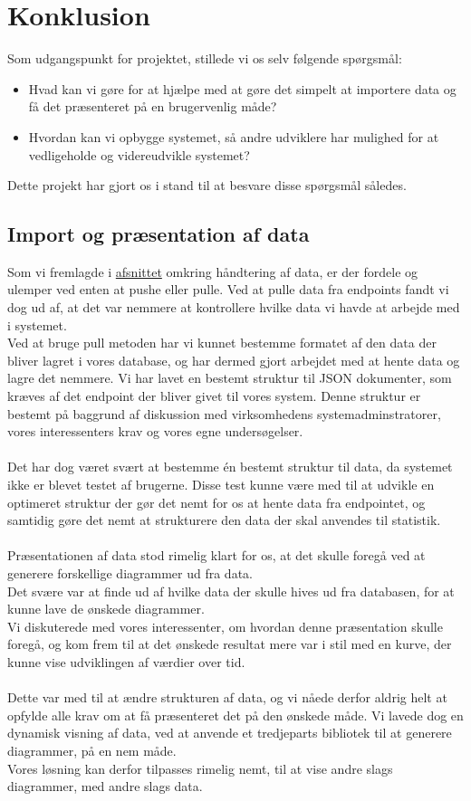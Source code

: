 \hypertarget{konklusion}{}
\section{Konklusion}
Som udgangspunkt for projektet, stillede vi os selv følgende spørgsmål:
\begin{itemize}
    \item{Hvad kan vi gøre for at hjælpe med at gøre det simpelt at importere data og få det præsenteret på en brugervenlig måde?}
    \item{Hvordan kan vi opbygge systemet, så andre udviklere har mulighed for at vedligeholde og videreudvikle systemet?}
\end{itemize}
Dette projekt har gjort os i stand til at besvare disse spørgsmål således.
\subsection{Import og præsentation af data}
Som vi fremlagde i \hyperlink{push-or-pull}{afsnittet} omkring håndtering af data, er der fordele og ulemper ved enten at pushe
eller pulle. Ved at pulle data fra endpoints fandt vi dog ud af, at det var nemmere at kontrollere hvilke data vi havde at arbejde
med i systemet.
\\
Ved at bruge pull metoden har vi kunnet bestemme formatet af den data der bliver lagret i vores database, og har dermed gjort arbejdet med at hente data og lagre det nemmere.
Vi har lavet en bestemt struktur til JSON dokumenter, som kræves af det endpoint der bliver givet til vores system.
Denne struktur er bestemt på baggrund af diskussion med virksomhedens systemadminstratorer, vores interessenters krav og vores egne undersøgelser.
\\\\
Det har dog været svært at bestemme én bestemt struktur til data, da systemet ikke er blevet testet af brugerne.
Disse test kunne være med til at udvikle en optimeret struktur der gør det nemt for os at hente data fra endpointet,
og samtidig gøre det nemt at strukturere den data der skal anvendes til statistik.
\\\\
Præsentationen af data stod rimelig klart for os, at det skulle foregå ved at generere forskellige diagrammer ud fra data.
\\
Det svære var at finde ud af hvilke data der skulle hives ud fra databasen, for at kunne lave de ønskede diagrammer.
\\
Vi diskuterede med vores interessenter, om hvordan denne præsentation skulle foregå, og kom frem til at det ønskede resultat
mere var i stil med en kurve, der kunne vise udviklingen af værdier over tid.
\\\\
Dette var med til at ændre strukturen af data, og vi nåede derfor aldrig helt at opfylde alle krav om at få præsenteret
det på den ønskede måde.
Vi lavede dog en dynamisk visning af data, ved at anvende et tredjeparts bibliotek til at generere diagrammer, på en nem måde.
\\
Vores løsning kan derfor tilpasses rimelig nemt, til at vise andre slags diagrammer, med andre slags data.
